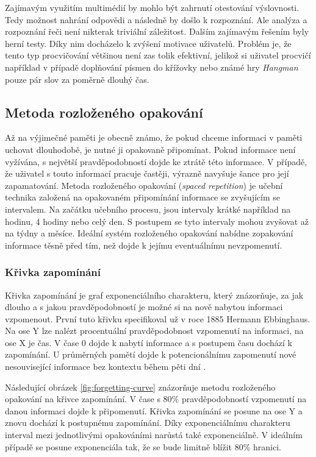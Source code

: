 \documentclass[a4paper,11pt,titlepage,fleqn]{article}
\begin{document}
                Zajímavým využitím multimédií by mohlo být zahrnutí otestování výslovnosti. Tedy možnost nahrání odpovědi a následně by došlo k rozpoznání. Ale analýza a rozpoznání řeči není nikterak triviální záležitost. Dalším zajímavým řešením byly herní testy. Díky nim docházelo k zvýšení motivace uživatelů. Problém je, že tento typ procvičování většinou není zas tolik efektivní, jelikož si uživatel procvičí například v případě doplňování písmen do křížovky nebo známé hry \textit{Hangman} pouze pár slov za poměrně dlouhý čas.

        \subsection{Metoda rozloženého opakování}
            \label{spaced-repetition}
            Až na výjimečné paměti je obecně známo, že pokud chceme informaci v paměti uchovat dlouhodobě, je nutné ji opakovaně připomínat. Pokud informace není vyžívána, s největší pravděpodobností dojde ke ztrátě této informace. V případě, že uživatel s touto informací pracuje častěji, výrazně navyšuje šance pro její zapamatování. Metoda rozloženého opakování (\textit{spaced repetition}) je učební technika založená na opakovaném připomínání informace se zvyšujícím se intervalem\cite{bib:spaced-rep}. Na začátku učebního procesu, jsou intervaly krátké například na hodinu, 4 hodiny nebo celý den. S postupem se tyto intervaly mohou zvyšovat až na týdny a měsíce. Ideální systém rozloženého opakování nabídne zopakování informace těsně před tím, než dojde k jejímu eventuálnímu nevzpomenutí.

        \subsubsection{Křivka zapomínání}
            Křivka zapomínání je graf exponenciálního charakteru, který znázorňuje, za jak dlouho a s jakou pravděpodobností je možné si na nově nabytou informaci vzpomenout. První tuto křivku specifikoval už v roce 1885 Hermann Ebbinghaus. Na ose Y lze nalézt procentuální pravděpodobnost vzpomenutí na informaci, na ose X je čas. V čase 0 dojde k nabytí informace a s postupem času dochází k zapomínání. U průměrných pamětí dojde k potencionálnímu zapomenutí nové nesouvisející informace bez kontextu během pěti dní \cite{bib:ebbinghaus}.

            Následující obrázek \ref{fig:forgetting-curve} znázorňuje metodu rozloženého opakování na křivce zapomínání. V čase s 80\% pravděpodobností vzpomenutí na danou informaci dojde k připomenutí. Křivka zapomínání se posune na ose Y a znovu dochází k postupnému zapomínání. Díky exponenciálnímu charakteru interval mezi jednotlivými opakováními narůstá také exponenciálně. V ideálním případě se posune exponenciála tak, že se bude limitně blížit 80\% hranici.
\end{document}
